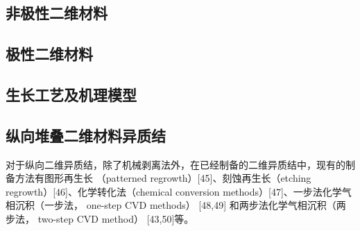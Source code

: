 \subsection{非极性二维材料}

\subsection{极性二维材料}
\subsection{生长工艺及机理模型}

\subsection{纵向堆叠二维材料异质结}
对于纵向二维异质结，除了机械剥离法外，在已经制备的二维异质结中，现有的制备方法有图形再生长
（patterned regrowth）[45]、刻蚀再生长（etching regrowth）[46]、化学转化法（chemical 
conversion methods）[47]、一步法化学气相沉积（一步法， one-step CVD methods） [48,49]
和两步法化学气相沉积（两步法， two-step CVD method） [43,50]等。



